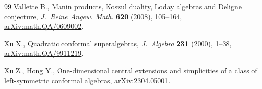 \documentclass[11pt]{article}
\numberwithin{equation}{section}
\numberwithin{equation}{section}
\begin{document}
\begin{thebibliography}{99}
Vallette B., Manin products, {K}oszul duality, {L}oday algebras and {D}eligne
 conjecture, \href{https://doi.org/10.1515/CRELLE.2008.051}{\textit{J.~Reine Angew. Math.}} \textbf{620} (2008), 105--164,
 \href{https://arxiv.org/abs/math.QA/0609002}{arXiv:math.QA/0609002}.

Xu X., Quadratic conformal superalgebras, \href{https://doi.org/10.1006/jabr.1999.8346}{\textit{J.~Algebra}} \textbf{231}
 (2000), 1--38, \href{https://arxiv.org/abs/math.QA/9911219}{arXiv:math.QA/9911219}.

Xu Z., Hong Y., One-dimensional central extensions and simplicities of a class
 of left-symmetric conformal algebras, \href{https://arxiv.org/abs/2304.05001}{arXiv:2304.05001}.

\end{thebibliography}
\end{document}
